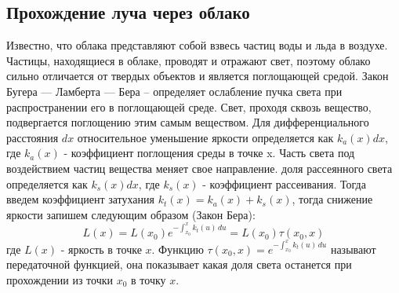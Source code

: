 \subsection{Прохождение луча через облако}
Известно, что облака представляют собой взвесь частиц воды и льда в воздухе.
Частицы, находящиеся в облаке, проводят и отражают свет, поэтому облако
сильно отличается от твердых объектов и является поглощающей средой.
Закон Бугера — Ламберта — Бера – определяет ослабление пучка света при распространении его в поглощающей среде. 
Свет, проходя сквозь вещество, подвергается поглощению этим самым веществом. Для дифференциального расстояния $ dx $ относительное уменьшение яркости определяется как $ k_a(x)dx $, где $ k_a(x) $ - коэффициент поглощения среды в точке x. Часть света под воздействием частиц вещества меняет свое направление. доля рассеянного света определяется как $ k_s(x)dx $, где $ k_s(x) $ - коэффициент рассеивания. Тогда введем коэффициент затухания $ k_t(x)  = k_a(x) + k_s(x) $, тогда снижение яркости запишем следующим образом (Закон Бера):  
\begin{equation}
\label{for:beers_law}
L(x) = L(x_0) e^{-\int_{x_0}^{x} k_t(u)\,du}=L(x_0)\tau(x_0, x) 
\end{equation}
где $ L(x) $ - яркость в точке $ x $. Функцию $ \tau(x_0, x) = e^{-\int_{x_0}^{x} k_t(u)\,du}  $ называют передаточной функцией, она показывает какая доля света останется при прохождении из точки $ x_0 $ в точку $ x $.




